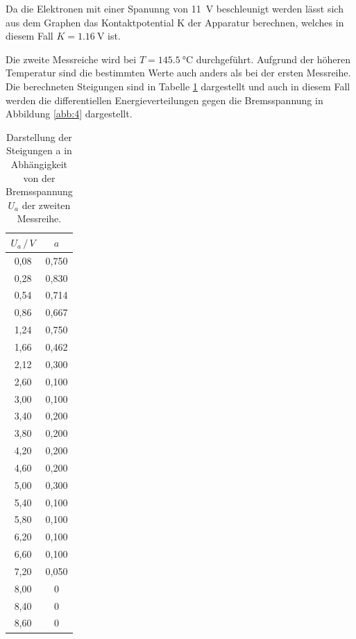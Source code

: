 Da die Elektronen mit einer Spanunng von \SI{11}{\volt} beschleunigt werden lässt
sich aus dem Graphen das Kontaktpotential K der Apparatur berechnen, welches in diesem
Fall $ K = \SI{1.16}{\volt}$ ist.

Die zweite Messreiche wird bei $ T = \SI{145.5}{\celsius}$ durchgeführt.
Aufgrund der höheren Temperatur sind die bestimmten Werte auch anders als bei der
ersten Messreihe. Die berechneten Steigungen sind in Tabelle \ref{tab:3} dargestellt
und auch in diesem Fall werden die differentiellen Energieverteilungen gegen
die Bremsspannung in Abbildung \ref{abb:4} dargestellt.

\begin{table}[H]
  \centering
  \caption{Darstellung der Steigungen a in Abhängigkeit von der Bremsspannung $U_a$
  der zweiten Messreihe.}
  \label{tab:3}
  \begin{tabular}{c c}
    \toprule
    $U_a \, / \, V$ & $a$ \\
    \midrule
    0,08 & 0,750  \\
    0,28 & 0,830  \\
    0,54 & 0,714  \\
    0,86 & 0,667  \\
    1,24 & 0,750  \\
    1,66 & 0,462  \\
    2,12 & 0,300  \\
    2,60 & 0,100  \\
    3,00 & 0,100  \\
    3,40 & 0,200  \\
    3,80 & 0,200  \\
    4,20 & 0,200  \\
    4,60 & 0,200  \\
    5,00 & 0,300  \\
    5,40 & 0,100  \\
    5,80 & 0,100  \\
    6,20 & 0,100  \\
    6,60 & 0,100  \\
    7,20 & 0,050  \\
    8,00 & 0  \\
    8,40 & 0  \\
    8,60 & 0  \\
    \bottomrule
  \end{tabular}
\end{table}

